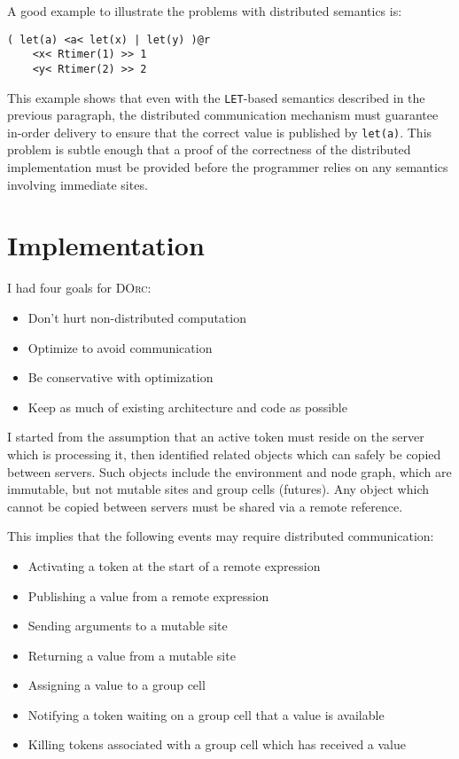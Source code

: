 \documentclass[10pt,letterpaper]{article}
\begin{document}
A good example to illustrate the problems with distributed semantics is:
\begin{verbatim}
( let(a) <a< let(x) | let(y) )@r
    <x< Rtimer(1) >> 1
    <y< Rtimer(2) >> 2
\end{verbatim}
This example shows that even with the \texttt{LET}-based semantics described in
the previous paragraph, the distributed communication mechanism must guarantee
in-order delivery to ensure that the correct value is published by
\texttt{let(a)}.  This problem is subtle enough that a proof of the correctness
of the distributed implementation must be provided before the programmer relies
on any semantics involving immediate sites.

\section{Implementation}

I had four goals for \textsc{DOrc}:
\begin{itemize}
\item Don't hurt non-distributed computation
\item Optimize to avoid communication
\item Be conservative with optimization
\item Keep as much of existing architecture and code as possible
\end{itemize}

I started from the assumption that an active token must reside on the server
which is processing it, then identified related objects which can safely be
copied between servers. Such objects include the environment and node graph,
which are immutable, but not mutable sites and group cells (futures). Any
object which cannot be copied between servers must be shared via a remote
reference.

This implies that the following events may require distributed communication:
\begin{itemize}
\item Activating a token at the start of a remote expression
\item Publishing a value from a remote expression
\item Sending arguments to a mutable site
\item Returning a value from a mutable site
\item Assigning a value to a group cell
\item Notifying a token waiting on a group cell that a value is available
\item Killing tokens associated with a group cell which has received a value
\end{itemize}
\end{document}
